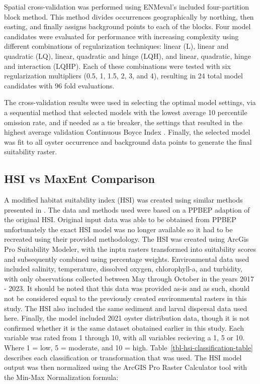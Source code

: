 \documentclass[
  review]{elsarticle}
\begin{document}
Spatial cross-validation was performed using ENMeval's included
four-partition block method. This method divides occurrences
geographically by northing, then easting, and finally assigns background
points to each of the blocks. Four model candidates were evaluated for
performance with increasing complexity using different combinations of
regularization techniques: linear (L), linear and quadratic (LQ),
linear, quadratic and hinge (LQH), and linear, quadratic, hinge and
interaction (LQHP). Each of these combinations were tested with six
regularization multipliers (0.5, 1, 1.5, 2, 3, and 4), resulting in 24
total model candidates with 96 fold evaluations.

The cross-validation results were used in selecting the optimal model
settings, via a sequential method that selected models with the lowest
average 10 percentile omission rate, and if needed as a tie breaker, the
settings that resulted in the highest average validation Continuous
Boyce Index \citep{Hirzel2006}. Finally, the selected model was fit to
all oyster occurrence and background data points to generate the final
suitability raster.

\subsection{HSI vs MaxEnt Comparison}\label{hsi-vs-maxent-comparison}

A modified habitat suitability index (HSI) was created using similar
methods presented in \citet{Geselbracht2024}. The data and methods used
were based on a PPBEP adaption of the original HSI. Original input data
was able to be obtained from PPBEP unfortunately the exact HSI model was
no longer available so it had to be recreated using their provided
methodology. The HSI was created using ArcGis Pro Suitability Modeler,
with the inptu rasters transformed into suitability scores and
subsequently combined using percentage weights. Environmental data used
included salinity, temperature, dissolved oxygen, chlorophyll-a, and
turbidity, with only observations collected between May through October
in the years 2017 - 2023. It should be noted that this data was provided
as-is and as such, should not be considered equal to the previously
created environmental rasters in this study. The HSI also included the
same sediment and larval dispersal data used here. Finally, the model
included 2021 oyster distribution data, though it is not confirmed
whether it is the same dataset obatained earlier in this study. Each
variable was rated from 1 through 10, with all variables recieving a 1,
5 or 10. Where 1 = low, 5 = moderate, and 10 = high.
Table~\ref{tbl-hsi-classification-table} describes each classification
or transformation that was used. The HSI model output was then
normalized using the ArcGIS Pro Raster Calculator tool with the Min-Max
Normalization formula:
\end{document}
